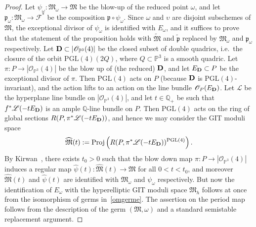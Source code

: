 \documentclass[11pt]{amsart}
\numberwithin{equation}{section}
\theoremstyle{plain}
\theoremstyle{remark}
\theoremstyle{definition}
\newcommand{\cF}{\mathscr{F}}
\newcommand{\gp}{\mathfrak{p}}
\newcommand{\PGL}{\mathrm{PGL}}
\newcommand{\Proj}{\mathrm{Proj}}
\newcommand{\cL}{{\mathscr L}}
\newcommand{\cO}{{\mathscr O}}
\newcommand{\gM}{\mathfrak{M}}
\newcommand{\PP}{{\mathbb P}}
\newcommand{\QQ}{{\mathbb Q}}
\newcommand{\wh}{\widehat}
\newcommand{\wt}{\widetilde}
\begin{document}
\begin{proof}
%
Let $\psi_{\omega}\colon\gM_{\omega}\to\gM$ be the blow-up of the reduced point $\omega$, and let $\gp_{\omega}\colon \gM_{\omega}\to\cF^{*}$ be the composition $\gp\circ\psi_{\omega}$. Since $\omega$ and $\upsilon$ are disjoint subschemes of $\gM$, the exceptional divisor of $\psi_{\omega}$ is identified with $E_{\omega}$, and it suffices to prove that the statement of the proposition holds with $\wt{\gM}$ and $\wt{\gp}$ replaced by $\gM_{\omega}$ and $\gp_{\omega}$ respectively. Let ${\bf D}\subset |\cO_{\PP^3}(4)|$ be the closed subset of double quadrics, i.e.~the closure of the orbit $\PGL(4)(2{Q})$, where ${Q}\subset\PP^3$ is a smooth quadric. Let $\pi\colon P\to 
 |\cO_{\PP^3}(4)|$ be the blow up of (the reduced) ${\bf D}$, and let $E_{\bf D}\subset P$ be the exceptional divisor of $\pi$. Then $\PGL(4)$ acts on $P$ (because ${\bf D}$ is $\PGL(4)$-invariant), and the action lifts to an action on the line bundle $\cO_P(E_{\bf D})$. Let $\cL$ be the hyperplane line bundle on $ |\cO_{\PP^3}(4)|$, and let $t\in\QQ_{+}$ be such that $f^{*}\cL(-t E_{\bf D})$ is an ample $\QQ$-line bundle on $P$.  Then $\PGL(4)$ acts on the ring of global sections $R(P,\pi^{*}\cL(-t E_{\bf D}))$, and hence we may consider the GIT moduli space
 \begin{equation*}
%
\wh{\gM}(t):=\Proj\left(R(P,\pi^{*}\cL(-t E_{\bf D}))^{\PGL(4)}\right).
%
\end{equation*}
%
By Kirwan~\cite{kirwan}, there exists $t_0>0$ such that the blow down map $\pi\colon P\to  |\cO_{\PP^3}(4)|$ induces a regular map $\wh{\psi}(t)\colon\wh{\gM}(t)\to\gM$ 
for all $0<t<t_0$, and moreover  $\wh{\gM}(t)$ and $\wh{\psi}(t)$  are identified with $\gM_{\omega}$ and $\psi_{\omega}$ respectively. But now the identification of $E_{\omega}$   with the   hyperelliptic GIT moduli space $\gM_h$ follows at once from  the isomorphism of germs in~\eqref{omgerme}. The assertion on the period map follows from the description of the germ  $(\gM,\omega)$ and a standard semistable replacement argument.
%
\end{proof}
%
%
\end{document}
